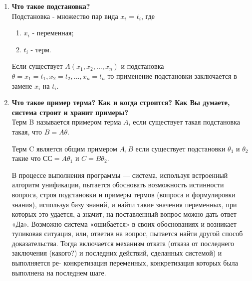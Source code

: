 \begin{enumerate}
    \item \textbf{Что такое подстановка?}\\
    Подстановка - множество пар вида {$x_i$ = $t_i$}, где
    \begin{enumerate}
    	\item $x_i$ - переменная;
    	\item $t_i$ - терм.
    \end{enumerate}
    
    Если существует $A(x_1, x_2, ..., x_n)$ и подстановка $\theta = {x_1 = t_1, x_2 = t_2, ... , x_n = t_n}$ то применение подстановки заключается в замене $x_i$ на $t_i$.
    
    
    
    \item \textbf{Что такое пример терма? Как и когда строится? Как Вы думаете, система строит и хранит примеры?}\\
    
    Терм B называется примером терма $A$, если существует такая подстановка такая, что $B = A  \theta$.
    
    Терм C является общим примером $A, B$ если существует подстановки $\theta_1$ и $\theta_2$ такие что С$ С = A \theta_1$ и $C = B \theta_2$.
    
    В процессе выполнения программы — система, используя встроенный алгоритм унификации, пытается обосновать возможность истинности вопроса, строя подстановки и примеры термов (вопроса и формулировки знания), используя базу знаний, и найти такие значения переменных, при которых это удается, а значит, на поставленный вопрос можно дать ответ «Да». Возможно система «ошибается» в своих обоснованиях и возникает тупиковая ситуация, или, ответив на вопрос, пытается найти другой способ доказательства. Тогда включается механизм отката (отказа от последнего заключения (какого?) и последних действий, сделанных системой) и выполняется ре- конкретизация переменных, конкретизация которых была выполнена на последнем шаге.
    

\end{enumerate}

